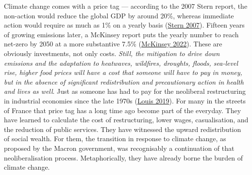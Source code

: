 \documentclass[a4paper, nobind]{templates/ociamthesis}
\begin{document}
Climate change comes with a price tag --- according to the 2007 Stern report, the non-action would reduce the global GDP by around 20\%, whereas immediate action would require as much as 1\% on a yearly basis (\protect\hyperlink{ref-stern_economics_2007}{Stern 2007}). Fifteen years of growing emissions later, a McKinsey report puts the yearly number to reach net-zero by 2050 at a more substantive 7.5\% (\protect\hyperlink{ref-mckinsey_net-zero_2022}{McKinsey 2022}). These are obviously investments, not only costs. \emph{Still, the mitigation to drive down emissions and the adaptation to heatwaves, wildfires, droughts, floods, sea-level rise, higher food prices will have a cost that someone will have to pay in money, but in the absence of significant redistribution and precautionary action in health and lives as well}. Just as someone has had to pay for the neoliberal restructuring in industrial economies since the late 1970s (\protect\hyperlink{ref-louis_who_2019}{Louis 2019}). For many in the streets of France that price tag has a long time ago become part of the everyday. They have learned to calculate the cost of restructuring, lower wages, casualisation, and the reduction of public services. They have witnessed the upward redistribution of social wealth. For them, the transition in response to climate change, as proposed by the Macron government, was recognisably a continuation of that neoliberalisation process. Metaphorically, they have already borne the burden of climate change.
\end{document}
